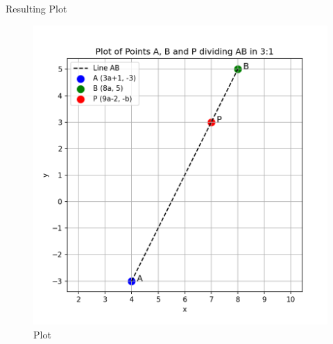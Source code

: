 \documentclass{beamer}
\begin{document}
\begin{frame}{Resulting Plot}
\begin{figure}
\centering
\includegraphics[width=0.75\columnwidth]{figs/plt.png}
\caption{Plot}
\label{fig:plot}
\end{figure}
\end{frame}
\end{document}
